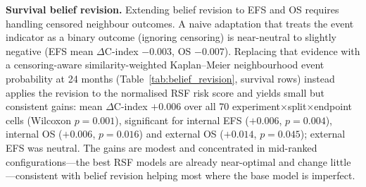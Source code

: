 \documentclass[pdflatex,sn-nature]{sn-jnl}
\begin{document}
\textbf{Survival belief revision.}
Extending belief revision to EFS and OS requires handling censored
neighbour outcomes.
A naive adaptation that treats the event indicator as a binary outcome
(ignoring censoring) is near-neutral to slightly negative
(EFS mean $\Delta$C-index $-0.003$, OS $-0.007$).
Replacing that evidence with a censoring-aware similarity-weighted
Kaplan--Meier neighbourhood event probability at 24 months
(Table~\ref{tab:belief_revision}, survival rows) instead applies the
revision to the normalised RSF risk score and yields small but
consistent gains: mean $\Delta$C-index $+0.006$ over all 70
experiment$\times$split$\times$endpoint cells (Wilcoxon $p=0.001$),
significant for internal EFS ($+0.006$, $p=0.004$), internal OS
($+0.006$, $p=0.016$) and external OS ($+0.014$, $p=0.045$); external
EFS was neutral.
The gains are modest and concentrated in mid-ranked configurations—the
best RSF models are already near-optimal and change little—consistent
with belief revision helping most where the base model is imperfect.
\end{document}
